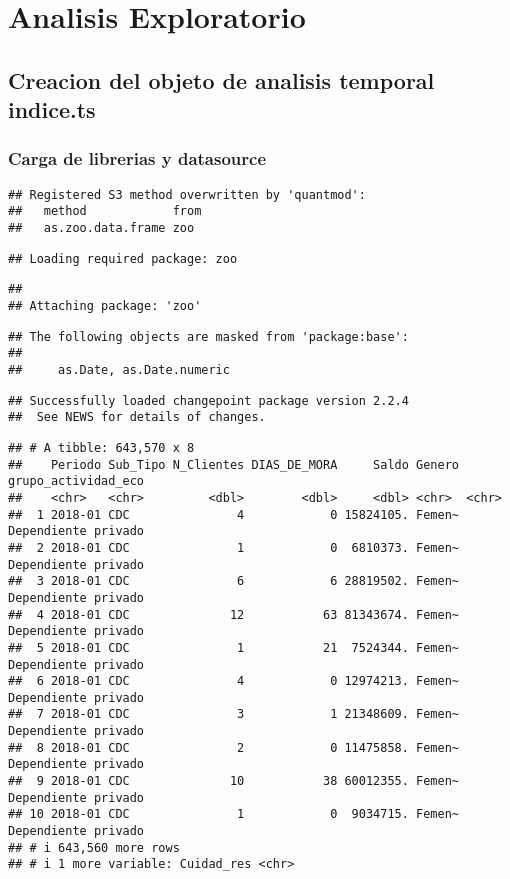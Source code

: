 \documentclass[
]{book}
\begin{document}
\hypertarget{Analisis}{%
\chapter{Analisis Exploratorio}\label{Analisis}}

\hypertarget{creacion-del-objeto-de-analisis-temporal-indice.ts}{%
\section{Creacion del objeto de analisis temporal indice.ts}\label{creacion-del-objeto-de-analisis-temporal-indice.ts}}

\hypertarget{carga-de-librerias-y-datasource}{%
\subsection{Carga de librerias y datasource}\label{carga-de-librerias-y-datasource}}

\begin{verbatim}
## Registered S3 method overwritten by 'quantmod':
##   method            from
##   as.zoo.data.frame zoo
\end{verbatim}

\begin{verbatim}
## Loading required package: zoo
\end{verbatim}

\begin{verbatim}
## 
## Attaching package: 'zoo'
\end{verbatim}

\begin{verbatim}
## The following objects are masked from 'package:base':
## 
##     as.Date, as.Date.numeric
\end{verbatim}

\begin{verbatim}
## Successfully loaded changepoint package version 2.2.4
##  See NEWS for details of changes.
\end{verbatim}

\begin{verbatim}
## # A tibble: 643,570 x 8
##    Periodo Sub_Tipo N_Clientes DIAS_DE_MORA     Saldo Genero grupo_actividad_eco
##    <chr>   <chr>         <dbl>        <dbl>     <dbl> <chr>  <chr>              
##  1 2018-01 CDC               4            0 15824105. Femen~ Dependiente privado
##  2 2018-01 CDC               1            0  6810373. Femen~ Dependiente privado
##  3 2018-01 CDC               6            6 28819502. Femen~ Dependiente privado
##  4 2018-01 CDC              12           63 81343674. Femen~ Dependiente privado
##  5 2018-01 CDC               1           21  7524344. Femen~ Dependiente privado
##  6 2018-01 CDC               4            0 12974213. Femen~ Dependiente privado
##  7 2018-01 CDC               3            1 21348609. Femen~ Dependiente privado
##  8 2018-01 CDC               2            0 11475858. Femen~ Dependiente privado
##  9 2018-01 CDC              10           38 60012355. Femen~ Dependiente privado
## 10 2018-01 CDC               1            0  9034715. Femen~ Dependiente privado
## # i 643,560 more rows
## # i 1 more variable: Cuidad_res <chr>
\end{verbatim}
\end{document}
